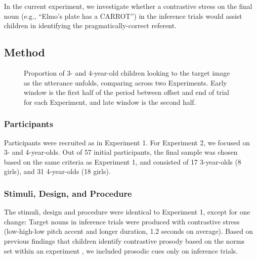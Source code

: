 \documentclass[10pt,letterpaper]{article}
\begin{document}
In the current experiment, we investigate whether a contrastive stress on the final noun (e.g., ``Elmo's plate has a CARROT'') in the inference trials would assist children in identifying the pragmatically-correct referent.

\subsection{Method}


\begin{figure}[t]
	\caption{\label{fig:pros0} Proportion of 3- and 4-year-old children looking to the target image as the utterance unfolds, comparing across two Experiments. Early window is the first half of the period between offset and end of trial for each Experiment, and late window is the second half.}
\end{figure}

\subsubsection{Participants}

Participants were recruited as in Experiment 1. For Experiment 2, we focused on 3- and 4-year-olds. Out of 57 initial participants, the final sample was chosen based on the same criteria as Experiment 1, and consisted of 17 3-year-olds (8 girls), and 31 4-year-olds (18 girls).

\subsubsection{Stimuli, Design, and Procedure}

The stimuli, design and procedure were identical to Experiment 1, except for one change: Target nouns in inference trials were produced with contrastive stress (low-high-low pitch accent and longer duration, 1.2 seconds on average). Based on previous findings that children identify contrastive prosody based on the norms set within an experiment \cite{kurumada2014}, we included prosodic cues only on inference trials. 
\end{document}
